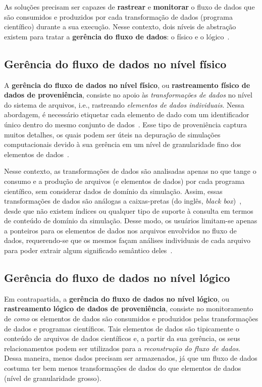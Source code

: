 As soluções precisam ser capazes de \textbf{rastrear} e \textbf{monitorar} o fluxo de dados que são consumidos e produzidos por cada transformação de dados (programa científico) durante a sua execução. Nesse contexto, dois níveis de abstração existem para tratar a \textbf{gerência do fluxo de dados}: o físico e o lógico~\cite{silva2015propostadoutorado}.

\subsection{Gerência do fluxo de dados no nível físico}%
\label{sec:gerencia-do-fluxo-de-dados-no-nivel-fisico}

A \textbf{gerência do fluxo de dados no nível físico}, ou \textbf{rastreamento físico de dados de proveniência}, consiste no apoio às \emph{transformações de dados} no nível do sistema de arquivos, i.e., rastreando \emph{elementos de dados individuais}. Nessa abordagem, é necessário etiquetar cada elemento de dado com um identificador único dentro do mesmo conjunto de dados~\cite{silva2015propostadoutorado}. Esse tipo de proveniência captura muitos detalhes, os quais podem ser úteis na depuração de simulações computacionais devido à sua gerência em um nível de granularidade fino dos elementos de dados~\cite{silva2017raw}.

Nesse contexto, as transformações de dados são analisadas apenas no que tange o consumo e a produção de arquivos (e elementos de dados) por cada programa científico, sem considerar dados de domínio da simulação. Assim, essas transformações de dados são análogas a caixas-pretas (do inglês, \textit{black box})~\cite{silva2017raw}, desde que não existem índices ou qualquer tipo de suporte à consulta em termos de conteúdo de domínio da simulação. Desse modo, os usuários limitam-se apenas a ponteiros para os elementos de dados nos arquivos envolvidos no fluxo de dados, requerendo-se que os mesmos façam análises individuais de cada arquivo para poder extrair algum significado semântico deles~\cite{silva2015propostadoutorado}.

\subsection{Gerência do fluxo de dados no nível lógico}%
\label{sec:gerencia-do-fluxo-de-dados-no-nivel-logico}

Em contrapartida, a \textbf{gerência do fluxo de dados no nível lógico}, ou \textbf{rastreamento lógico de dados de proveniência}, consiste no monitoramento de \emph{como} os elementos de dados são consumidos e produzidos pelas transformações de dados e programas científicos. Tais elementos de dados são tipicamente o conteúdo de arquivos de dados científicos e, a partir da sua gerência, os seus relacionamentos podem ser utilizados para a \emph{reconstrução do fluxo de dados}. Dessa maneira, menos dados precisam ser armazenados, já que um fluxo de dados costuma ter bem menos transformações de dados do que elementos de dados~\cite{silva2015propostadoutorado} (nível de granularidade grosso).

